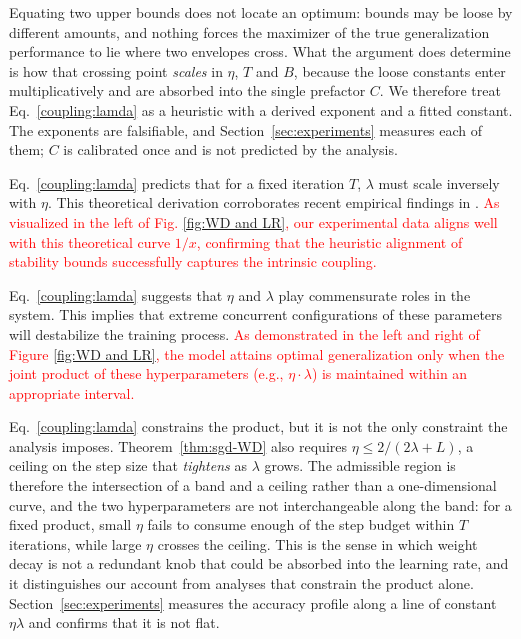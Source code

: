 \begin{remark}\label{rem:heuristic}
Equating two upper bounds does not locate an optimum: bounds may be loose by different amounts, and nothing forces the maximizer of the true generalization performance to lie where two envelopes cross. What the argument does determine is how that crossing point \emph{scales} in $\eta$, $T$ and $B$, because the loose constants enter multiplicatively and are absorbed into the single prefactor $C$. We therefore treat Eq.~\eqref{coupling:lamda} as a heuristic with a derived exponent and a fitted constant. The exponents are falsifiable, and Section~\ref{sec:experiments} measures each of them; $C$ is calibrated once and is not predicted by the analysis.
\end{remark}

\begin{remark}
Eq.~\eqref{coupling:lamda} predicts that for a fixed iteration $T$, $\lambda$ must scale inversely with $\eta$. This theoretical derivation corroborates recent empirical findings in \cite{wang2025setadamwsweightdecay,bergsma2025powerlinesscalinglaws}. \textcolor{red}{As visualized in the left of Fig. \ref{fig:WD and LR}, our experimental data aligns well with this theoretical curve $1/x$, confirming that the heuristic alignment of stability bounds successfully captures the intrinsic coupling.}
\end{remark}

\begin{remark}
Eq.~\eqref{coupling:lamda} suggests that $\eta$ and $\lambda$ play commensurate roles in the system. This implies that extreme concurrent configurations of these parameters will destabilize the training process. \textcolor{red}{As demonstrated in the left and right of Figure \ref{fig:WD and LR}, the model attains optimal generalization only when the joint product of these hyperparameters (e.g., $\eta \cdot \lambda$) is maintained within an appropriate interval.}
\end{remark}

\begin{remark}\label{rem:twosided}
Eq.~\eqref{coupling:lamda} constrains the product, but it is not the only constraint the analysis imposes. Theorem~\ref{thm:sgd-WD} also requires $\eta \leq 2/(2\lambda + L)$, a ceiling on the step size that \emph{tightens} as $\lambda$ grows. The admissible region is therefore the intersection of a band and a ceiling rather than a one-dimensional curve, and the two hyperparameters are not interchangeable along the band: for a fixed product, small $\eta$ fails to consume enough of the step budget within $T$ iterations, while large $\eta$ crosses the ceiling. This is the sense in which weight decay is not a redundant knob that could be absorbed into the learning rate, and it distinguishes our account from analyses that constrain the product alone. Section~\ref{sec:experiments} measures the accuracy profile along a line of constant $\eta\lambda$ and confirms that it is not flat.
\end{remark}

